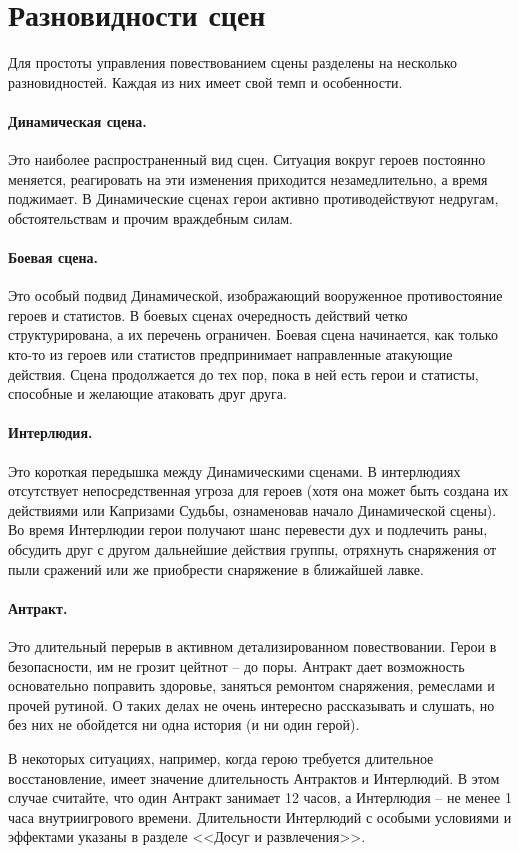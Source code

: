 \section{Разновидности сцен}
Для простоты управления повествованием сцены разделены на несколько разновидностей. Каждая из них имеет свой темп и особенности. 
\paragraph{Динамическая сцена.} Это наиболее распространенный вид сцен. Ситуация вокруг героев постоянно меняется, реагировать на эти изменения приходится незамедлительно, а время поджимает. В Динамические сценах герои активно противодействуют недругам, обстоятельствам и прочим враждебным силам. 
\paragraph{Боевая сцена.} Это особый подвид Динамической, изображающий вооруженное противостояние героев и статистов. В боевых сценах очередность действий четко структурирована, а их перечень ограничен. Боевая сцена начинается, как только кто-то из героев или статистов предпринимает направленные атакующие действия. Сцена продолжается до тех пор, пока в ней есть герои и статисты, способные и желающие атаковать друг друга.
\paragraph{Интерлюдия.} Это короткая передышка между Динамическими сценами. В интерлюдиях отсутствует непосредственная угроза для героев (хотя она может быть создана их действиями или Капризами Судьбы, ознаменовав начало Динамической сцены). Во время Интерлюдии герои получают шанс перевести дух и подлечить раны, обсудить друг с другом дальнейшие действия группы, отряхнуть снаряжения от пыли сражений или же приобрести снаряжение в ближайшей лавке.
\paragraph{Антракт.} Это длительный перерыв в активном детализированном повествовании. Герои в безопасности, им не грозит цейтнот – до поры. Антракт дает возможность основательно поправить здоровье, заняться ремонтом снаряжения, ремеслами и прочей рутиной. О таких делах не очень интересно рассказывать и слушать, но без них не обойдется ни одна история (и ни один герой). 
\begin{tcolorbox}
В некоторых ситуациях, например, когда герою требуется длительное восстановление, имеет значение длительность Антрактов и Интерлюдий. В этом случае считайте, что один Антракт занимает 12 часов, а Интерлюдия – не менее 1 часа внутриигрового времени. Длительности Интерлюдий с особыми условиями и эффектами указаны в разделе <<Досуг и развлечения>>.
\end{tcolorbox}

